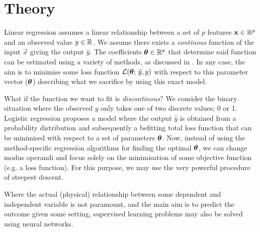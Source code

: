 \section{Theory}\label{sec:theory}

Linear regression assumes a linear relationship between a set of $p$ features $\vec{x}\in\RR[p]$ and an observed value $y\in\RR$. We assume there exists a \textit{continous} function of the input $\vec{x}$ giving the output $\hat{y}$. The coefficients $\svec{\theta}\in\RR[p]$ that determine said function can be estimated using a variety of methods, as discussed in \projectOne. In any case, the aim is to minimise some loss function $\mathcal{L}(\svec{\theta};\,\hat{y}, y)$ with respect to this parameter vector ($\svec{\theta}$) describing what we sacrifice by using this exact model. 

What if the function we want to fit is \textit{discontinous}? We consider the binary situation where the observed $y$ only takes one of two discrete values; 0 or 1. Logistic regression proposes a model where the output $\hat{y}$ is obtained from  a probability distribution and subsequently a befitting total loss function that can be minimised with respect to a set of parameters $\svec{\theta}$. Now, instead of using the method-specific regression algorithms for finding the optimal $\svec{\theta}$, we can change modus operandi and focus solely on the minimisation of some objective function (e.g. a loss function). For this purpose, we may use the very powerful procedure of steepest descent.

Where the actual (physical) relationship between some dependent and independent variable is not paramount, and the main aim is to predict the outcome given some setting, supervised learning problems may also be solved using neural networks. 



